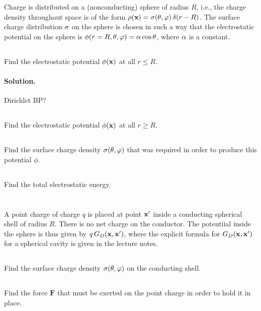\documentclass[11pt]{article}
\renewcommand{\vec}[1]{\mathbf{#1}}
\newenvironment{statement}[1]
{
	\section{#1}
	\color{darkgray}
	\ignorespaces
}
{
}
\newenvironment{problem}
{
	\subsection{}
	\color{darkgray}
    \ignorespaces
}
{

}
\newenvironment{solution}
{
    \paragraph{Solution.}
    \ignorespaces
}
{
    \bigskip
}
\begin{document}
\begin{statement}{}
	Charge is distributed on a (nonconducting) sphere of radius $R$, i.e., the charge density throughout space is of the form $\rhox = \sig(\tht, \vph) \, \delta(r - R)$.  The surface charge distribution $\sigma$ on the sphere is chosen in such a way that the electrostatic potential on the sphere is $\phi(r=R, \theta, \varphi) = \alpha \cos\theta$, where $\alpha$ is a constant.
\end{statement}

\begin{problem}
	Find the electrostatic potential $\phix$ at all $r \leq R$.
\end{problem}

\begin{solution}
	Dirichlet BP?
\end{solution}


\begin{problem}
	Find the electrostatic potential $\phix$ at all $r \geq R$.
\end{problem}

\begin{problem}
	Find the surface charge density $\sigma(\theta, \varphi)$ that was required in order to produce this potential $\phi$.
\end{problem}

\begin{problem}
	Find the total electrostatic energy.
\end{problem}



\newcommand{\Gd}{G_D}
\newcommand{\Gdxxp}{\Gd(\vx, \vx')}
\newcommand{\vF}{\vec{F}}

\begin{statement}{}
	A point charge of charge $q$ is placed at point $\vx'$ inside a conducting spherical shell of radius $R$.  There is no net charge on the conductor.  The potentiial inside the sphere is thus given by $q \, \Gdxxp$, where the explicit formula for $\Gdxxp$ for a spherical cavity is given in the lecture notes.
\end{statement}

\begin{problem}
	Find the surface charge density $\sigma(\theta, \varphi)$ on the conducting shell.
\end{problem}

\begin{problem}
	Find the force $\vF$ that must be exerted on the point charge in order to hold it in place.
\end{problem}
\end{document}
